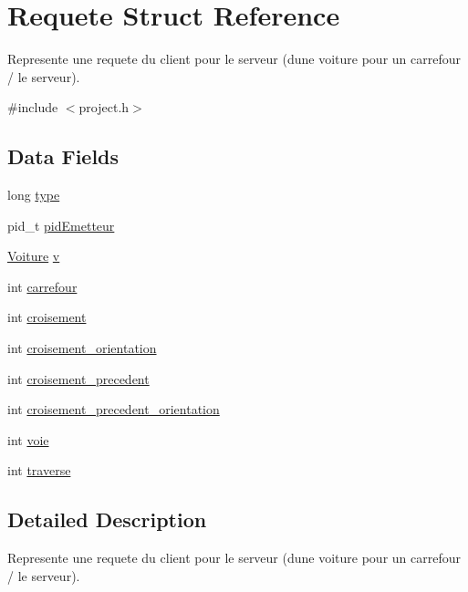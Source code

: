 \hypertarget{struct_requete}{}\section{Requete Struct Reference}
\label{struct_requete}


Represente une requete du client pour le serveur (d\textquotesingle{}une voiture pour un carrefour / le serveur).  




{\ttfamily \#include $<$project.\+h$>$}

\subsection*{Data Fields}
\begin{DoxyCompactItemize}
\item 
long \hyperlink{struct_requete_a6a83a8677f7c78fd146859325e08209a}{type}
\item 
pid\+\_\+t \hyperlink{struct_requete_a3041e2766c91f9b17975056266bfc841}{pid\+Emetteur}
\item 
\hyperlink{struct_voiture}{Voiture} \hyperlink{struct_requete_a76a64000aab59dcc4195c1b6e1605eb3}{v}
\item 
int \hyperlink{struct_requete_a49c1ca0385a5b276704a97cdceef2d83}{carrefour}
\item 
int \hyperlink{struct_requete_a558796b11448541e07f81ec0df5bf2bc}{croisement}
\item 
int \hyperlink{struct_requete_a0b2b0b49307840329ff724e792091c94}{croisement\+\_\+orientation}
\item 
int \hyperlink{struct_requete_ab1a425fa3b56a376a3fcac1f4491b1d0}{croisement\+\_\+precedent}
\item 
int \hyperlink{struct_requete_a9ee9e497cd0d78d4214a6507a550239c}{croisement\+\_\+precedent\+\_\+orientation}
\item 
int \hyperlink{struct_requete_ad5ecb866a563750cd63db63b9b56c060}{voie}
\item 
int \hyperlink{struct_requete_a276684defbdd9a2e8b95ce40b8ef3576}{traverse}
\end{DoxyCompactItemize}


\subsection{Detailed Description}
Represente une requete du client pour le serveur (d\textquotesingle{}une voiture pour un carrefour / le serveur). 


